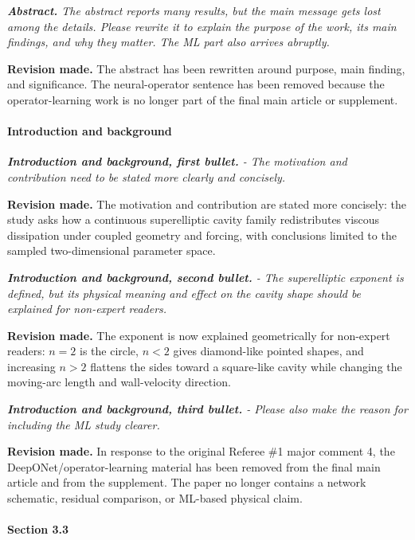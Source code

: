 \documentclass[11pt,a4paper]{article}
\newcommand{\qcomment}[1]{\textcolor{deepblue}{\itshape #1}}
\newcommand{\revwork}[1]{\textbf{\textcolor{revgreen}{#1}}}
\begin{document}
\medskip
\noindent\qcomment{\textbf{Abstract.} The abstract reports many results, but the main message gets lost among the details. Please rewrite it to explain the purpose of the work, its main findings, and why they matter. The ML part also arrives abruptly.}

\noindent\revwork{Revision made.} The abstract has been rewritten around purpose, main finding, and significance. The neural-operator sentence has been removed because the operator-learning work is no longer part of the final main article or supplement.

\medskip
\paragraph{Introduction and background}

\medskip
\noindent\qcomment{\textbf{Introduction and background, first bullet.} - The motivation and contribution need to be stated more clearly and concisely.}

\noindent\revwork{Revision made.} The motivation and contribution are stated more concisely: the study asks how a continuous superelliptic cavity family redistributes viscous dissipation under coupled geometry and forcing, with conclusions limited to the sampled two-dimensional parameter space.

\medskip
\noindent\qcomment{\textbf{Introduction and background, second bullet.} - The superelliptic exponent is defined, but its physical meaning and effect on the cavity shape should be explained for non-expert readers.}

\noindent\revwork{Revision made.} The exponent is now explained geometrically for non-expert readers: $n=2$ is the circle, $n<2$ gives diamond-like pointed shapes, and increasing $n>2$ flattens the sides toward a square-like cavity while changing the moving-arc length and wall-velocity direction.

\medskip
\noindent\qcomment{\textbf{Introduction and background, third bullet.} - Please also make the reason for including the ML study clearer.}

\noindent\revwork{Revision made.} In response to the original Referee \#1 major comment 4, the DeepONet/operator-learning material has been removed from the final main article and from the supplement. The paper no longer contains a network schematic, residual comparison, or ML-based physical claim.

\medskip
\paragraph{Section 3.3}
\end{document}
